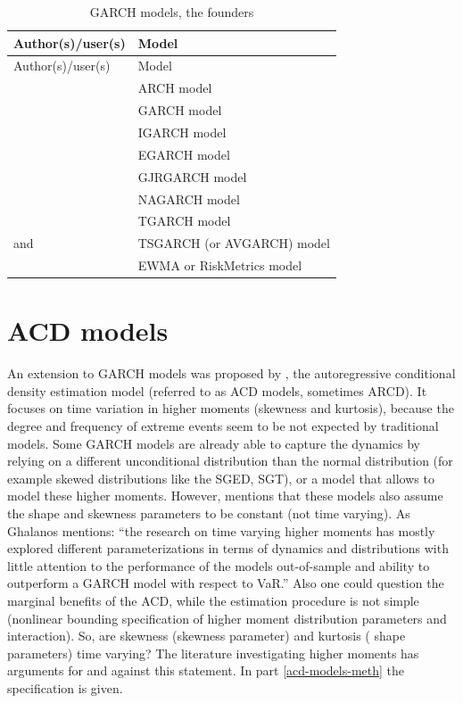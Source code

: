 \documentclass[a4paper, twoside]{templates/ociamthesis}
\begin{document}
\newpage

\begin{longtable}[]{@{}ll@{}}
\caption{GARCH models, the founders}\tabularnewline
\toprule
Author(s)/user(s) & Model\tabularnewline
\midrule
\endfirsthead
\toprule
Author(s)/user(s) & Model\tabularnewline
\midrule
\endhead
\textcite{engle1982} & ARCH model\tabularnewline
\textcite{bollerslev1986} & GARCH model\tabularnewline
\textcite{bollerslev1986} & IGARCH model\tabularnewline
\textcite{nelson1991} & EGARCH model\tabularnewline
\textcite{glosten1993} & GJRGARCH model\tabularnewline
\textcite{engle1993} & NAGARCH model\tabularnewline
\textcite{zakoian1994} & TGARCH model\tabularnewline
\textcite{taylor1986} and \textcite{schwert1989} & TSGARCH (or AVGARCH) model\tabularnewline
\textcite{morganguarantytrustcompany1996} & EWMA or RiskMetrics model\tabularnewline
\bottomrule
\end{longtable}

\hypertarget{acd-models}{%
\section{ACD models}\label{acd-models}}

An extension to GARCH models was proposed by \textcite{hansen1994}, the autoregressive conditional density estimation model (referred to as ACD models, sometimes ARCD). It focuses on time variation in higher moments (skewness and kurtosis), because the degree and frequency of extreme events seem to be not expected by traditional models. Some GARCH models are already able to capture the dynamics by relying on a different unconditional distribution than the normal distribution (for example skewed distributions like the SGED, SGT), or a model that allows to model these higher moments. However, \textcite{ghalanos2016} mentions that these models also assume the shape and skewness parameters to be constant (not time varying). As Ghalanos mentions: ``the research on time varying higher moments has mostly explored different parameterizations in terms of dynamics and distributions with little attention to the performance of the models out-of-sample and ability to outperform a GARCH model with respect to VaR.'' Also one could question the marginal benefits of the ACD, while the estimation procedure is not simple (nonlinear bounding specification of higher moment distribution parameters and interaction). So, are skewness (skewness parameter) and kurtosis ( shape parameters) time varying? The literature investigating higher moments has arguments for and against this statement. In part \ref{acd-models-meth} the specification is given.
\end{document}
